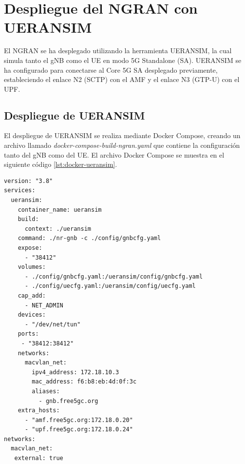 %
\section{Despliegue del NGRAN con UERANSIM}
El NGRAN se ha desplegado utilizando la herramienta UERANSIM, la cual simula tanto el gNB como el UE en modo 5G Standalone (SA). UERANSIM se ha configurado para conectarse al Core 5G SA desplegado previamente, estableciendo el enlace N2 (SCTP) con el AMF y el enlace N3 (GTP-U) con el UPF.
\subsection{Despliegue de UERANSIM}
El despliegue de UERANSIM se realiza mediante Docker Compose, creando un archivo llamado \textit{docker-compose-build-ngran.yaml} que contiene la configuración tanto del gNB como del UE. El archivo Docker Compose se muestra en el siguiente código \ref{lst:docker-ueransim}.
\begin{lstlisting}[style=yamlstyle, caption={Configuración del Docker Compose UERANSIM}, label=lst:docker-ueransim]
version: "3.8"
services:
  ueransim:
    container_name: ueransim
    build:
      context: ./ueransim
    command: ./nr-gnb -c ./config/gnbcfg.yaml
    expose:
      - "38412"
    volumes:
      - ./config/gnbcfg.yaml:/ueransim/config/gnbcfg.yaml
      - ./config/uecfg.yaml:/ueransim/config/uecfg.yaml
    cap_add:
      - NET_ADMIN
    devices:
      - "/dev/net/tun"
    ports:
     - "38412:38412"
    networks:
      macvlan_net:
        ipv4_address: 172.18.10.3
        mac_address: f6:b8:eb:4d:0f:3c
        aliases:
          - gnb.free5gc.org
    extra_hosts:
      - "amf.free5gc.org:172.18.0.20"
      - "upf.free5gc.org:172.18.0.24"   
networks:
  macvlan_net:
   external: true
\end{lstlisting}
